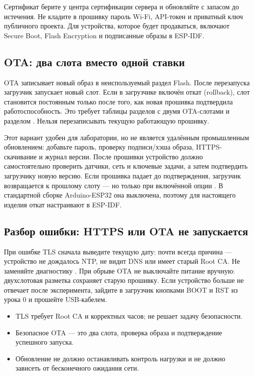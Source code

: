 
Сертификат берите у центра сертификации сервера и обновляйте с запасом до истечения. Не кладите в
прошивку пароль Wi-Fi, API-токен и приватный ключ публичного проекта. Для устройства, которое будет
продаваться, включают Secure Boot, Flash Encryption и подписанные образы в ESP-IDF.

\subsection{OTA: два слота вместо одной ставки}

OTA записывает новый образ в неиспользуемый раздел Flash. После перезапуска загрузчик запускает новый
слот. Если в загрузчике включён откат (rollback), слот становится постоянным только после того, как
новая прошивка подтвердила работоспособность. Это требует
таблицы разделов с двумя OTA-слотами и разделом . Нельзя перезаписывать текущую работающую
прошивку.


Этот вариант удобен для лаборатории, но не является удалённым промышленным обновлением: добавьте
пароль, проверку подписи/хэша образа, HTTPS-скачивание и журнал версии. После прошивки устройство
должно самостоятельно проверить датчики, сеть и ключевые задачи, а затем подтвердить загрузчику
новую версию. Если прошивка падает до подтверждения, загрузчик возвращается к прошлому слоту --- но
только при включённой опции . В стандартной сборке
Arduino-ESP32 она выключена, поэтому для настоящего изделия откат настраивают в ESP-IDF.

\subsection{Разбор ошибки: HTTPS или OTA не запускается}

При ошибке TLS сначала выведите текущую дату: почти всегда причина --- устройство не дождалось NTP,
не видит DNS или имеет старый Root CA. Не заменяйте диагностику . При обрыве OTA
не выключайте питание вручную: двухслотовая разметка сохраняет старую прошивку. Если устройство
больше не отвечает после эксперимента, зайдите в загрузчик кнопками BOOT и RST из урока 0 и прошейте
USB-кабелем.

\begin{summary}
\begin{itemize}[leftmargin=*]
  \item TLS требует Root CA и корректных часов;  не решает задачу безопасности.
  \item Безопасное OTA --- это два слота, проверка образа и подтверждение успешного запуска.
  \item Обновление не должно останавливать контроль нагрузки и не должно зависеть от бесконечного ожидания сети.
\end{itemize}
\end{summary}

